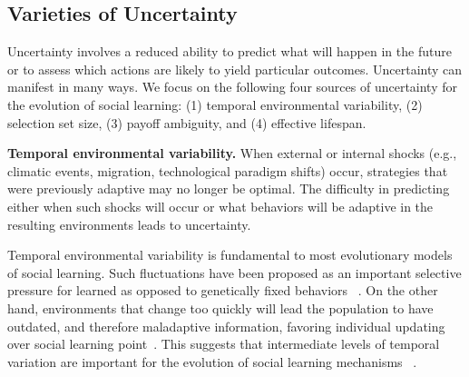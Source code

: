 \documentclass[letterpaper,11.5pt]{scrartcl}
\newcommand{\mt}[1]{{\textcolor{myorange} {({\tiny MT:} #1)}}}
\begin{document}

\subsection{Varieties of Uncertainty}

Uncertainty involves a reduced ability to predict what will happen in the future or to assess which actions are likely to yield particular outcomes. Uncertainty can manifest in many ways. We focus on the following four sources of uncertainty for the evolution of social learning: (1) temporal environmental variability, (2) selection set size, (3) payoff ambiguity, and (4) effective lifespan.

\textbf{Temporal environmental variability.} When external or internal shocks
(e.g., climatic events, migration, technological paradigm shifts) occur,
strategies that were previously adaptive may no longer be optimal. The difficulty
in predicting either when such shocks will occur or what behaviors will be
adaptive in the resulting environments leads to uncertainty. 

Temporal environmental variability is fundamental to most evolutionary models of
social learning. Such fluctuations have been proposed as an important selective
pressure for learned as opposed to genetically fixed behaviors
~\cite{Richerson2000}. On the other hand, environments that change too quickly
will lead the population to have outdated, and therefore maladaptive information,
favoring individual updating over social learning point~\cite{Feldman1996,
BoydRicherson1985}. This suggests that intermediate levels of temporal variation
are important for the evolution of social learning mechanisms ~\cite{aoki2005}.
\end{document}
